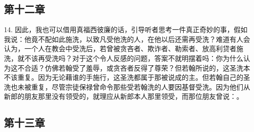 
\subsection{第十二章}

14. 因此，我也可以借用真福西彼廉的话，引导听者思考一件真正奇妙的事，假如我说：他竟不配如此施洗，以致凡受他洗的人，在他以后还需再受洗？难道有人会认为，一个人在教会中受洗后，若曾被贪吝者、欺诈者、勒索者、放高利贷者施洗，就不该再受洗吗？对于这个令人反感的问题，答案不就明摆着吗：你为什么认为这不合适？仿佛若翰受了羞辱，或贪吝者反得了尊荣？但若翰所说的，这圣洗本不该重复。因为无论藉谁的手施行，这圣洗都属于那被说成的主。但若翰自己的圣洗也未被重复，尽管宗徒保禄曾命令那些受若翰洗的人要因基督受洗。因为他们从新郎的朋友那里没有领受的，就理应从新郎本人那里领受，而那位朋友曾说：。\par


\subsection{第十三章}

